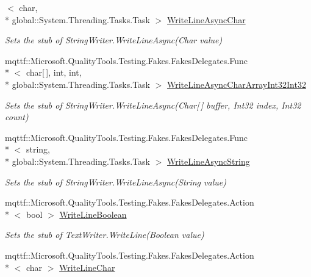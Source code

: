 \begin{DoxyCompactItemize}
$<$ char, \\*
global\-::\-System.\-Threading.\-Tasks.\-Task $>$ \hyperlink{class_system_1_1_i_o_1_1_fakes_1_1_stub_string_writer_acdc4a0259d9d7fed0a263ad9dd866b7e}{Write\-Line\-Async\-Char}
\begin{DoxyCompactList}\small\item\em Sets the stub of String\-Writer.\-Write\-Line\-Async(\-Char value)\end{DoxyCompactList}\item 
mqttf\-::\-Microsoft.\-Quality\-Tools.\-Testing.\-Fakes.\-Fakes\-Delegates.\-Func\\*
$<$ char\mbox{[}$\,$\mbox{]}, int, int, \\*
global\-::\-System.\-Threading.\-Tasks.\-Task $>$ \hyperlink{class_system_1_1_i_o_1_1_fakes_1_1_stub_string_writer_a62d638b24846379b91ec0bdd220d97c2}{Write\-Line\-Async\-Char\-Array\-Int32\-Int32}
\begin{DoxyCompactList}\small\item\em Sets the stub of String\-Writer.\-Write\-Line\-Async(\-Char\mbox{[}$\,$\mbox{]} buffer, Int32 index, Int32 count)\end{DoxyCompactList}\item 
mqttf\-::\-Microsoft.\-Quality\-Tools.\-Testing.\-Fakes.\-Fakes\-Delegates.\-Func\\*
$<$ string, \\*
global\-::\-System.\-Threading.\-Tasks.\-Task $>$ \hyperlink{class_system_1_1_i_o_1_1_fakes_1_1_stub_string_writer_a876b1ef3d98d9b43bb8c4171b86e2a8c}{Write\-Line\-Async\-String}
\begin{DoxyCompactList}\small\item\em Sets the stub of String\-Writer.\-Write\-Line\-Async(\-String value)\end{DoxyCompactList}\item 
mqttf\-::\-Microsoft.\-Quality\-Tools.\-Testing.\-Fakes.\-Fakes\-Delegates.\-Action\\*
$<$ bool $>$ \hyperlink{class_system_1_1_i_o_1_1_fakes_1_1_stub_string_writer_ac98149f7d123021aa29a85d39f9bc09b}{Write\-Line\-Boolean}
\begin{DoxyCompactList}\small\item\em Sets the stub of Text\-Writer.\-Write\-Line(\-Boolean value)\end{DoxyCompactList}\item 
mqttf\-::\-Microsoft.\-Quality\-Tools.\-Testing.\-Fakes.\-Fakes\-Delegates.\-Action\\*
$<$ char $>$ \hyperlink{class_system_1_1_i_o_1_1_fakes_1_1_stub_string_writer_a64891147817ec32254d1fd7ca1e452de}{Write\-Line\-Char}

\end{DoxyCompactItemize}
